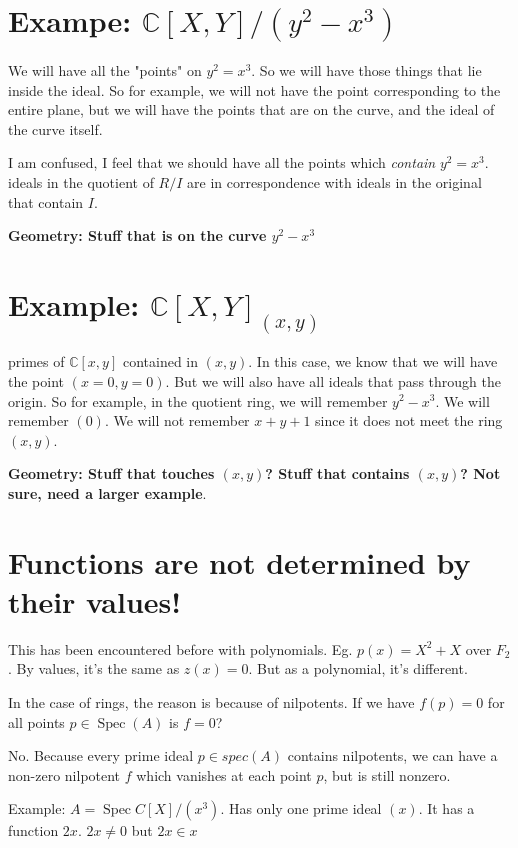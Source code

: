\documentclass{book}
\newcommand{\C}{\ensuremath{\mathbb{C}}}
\newcommand{\spec}{\operatorname{Spec}}
\theoremstyle{definition}
\begin{document}
\section{Exampe: $\C[X, Y]/(y^2 - x^3)$}

We will have all the "points" on $y^2 = x^3$. So we will have those things
that lie inside the ideal. So for example, we will not have the point
corresponding to the entire plane, but we will have the points that are
on the curve, and the ideal of the curve itself.

I am confused, I feel that we should have all the points which \emph{contain} $y^2 = x^3$.
ideals in the quotient of $R/I$ are in correspondence with ideals in the original that
contain $I$.

\textbf{Geometry: Stuff that is on the curve $y^2 - x^3$}


\section{Example: $\C[X, Y]_(x, y)$}

primes of $\C[x, y]$ contained in $(x, y)$. In this case, we know that we will
have the point $(x=0, y=0)$. But we will also have all ideals that pass through
the origin. So for example, in the quotient ring, we will remember $y^2 - x^3$.
We will remember $(0)$. We will not remember $x + y + 1$ since it does not
meet the ring $(x, y)$.


\textbf{Geometry: Stuff that touches $(x, y)$? Stuff that contains $(x, y)$? Not sure, need a larger example}.

\section{Functions are not determined by their values!}

This has been encountered before with
polynomials. Eg. $p(x) = X^2 + X$ over $F_2$. By values, it's the same
as $z(x) = 0$. But as a polynomial, it's different.

In the case of rings, the reason is because of nilpotents. If we have
$f(p) = 0$ for all points $p \in \spec(A)$ is $f = 0$? 

No. Because every prime ideal $p \in spec(A)$ contains nilpotents,
we can have a non-zero nilpotent $f$ which vanishes at each point $p$,
but is still nonzero.

Example: $A = \spec C[X]/(x^3)$. Has only one prime ideal $(x)$. It has 
a function $2x$. $2x \neq 0$ but $2x \in x$
\end{document}
